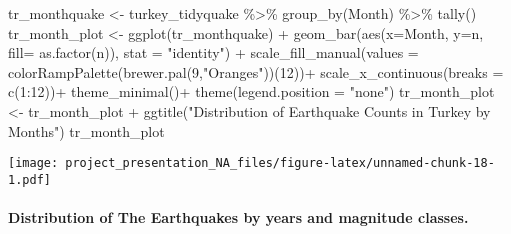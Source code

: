 \documentclass[
]{article}
\newenvironment{Shaded}{\begin{snugshade}}{\end{snugshade}}
\newcommand{\AttributeTok}[1]{\textcolor[rgb]{0.77,0.63,0.00}{#1}}
\newcommand{\DecValTok}[1]{\textcolor[rgb]{0.00,0.00,0.81}{#1}}
\newcommand{\FunctionTok}[1]{\textcolor[rgb]{0.00,0.00,0.00}{#1}}
\newcommand{\NormalTok}[1]{#1}
\newcommand{\OtherTok}[1]{\textcolor[rgb]{0.56,0.35,0.01}{#1}}
\newcommand{\SpecialCharTok}[1]{\textcolor[rgb]{0.00,0.00,0.00}{#1}}
\newcommand{\StringTok}[1]{\textcolor[rgb]{0.31,0.60,0.02}{#1}}
\begin{document}
\begin{Shaded}
\begin{Highlighting}[]
\NormalTok{tr\_monthquake }\OtherTok{\textless{}{-}}\NormalTok{ turkey\_tidyquake }\SpecialCharTok{\%\textgreater{}\%} 
                  \FunctionTok{group\_by}\NormalTok{(Month) }\SpecialCharTok{\%\textgreater{}\%} 
                  \FunctionTok{tally}\NormalTok{()}
\NormalTok{tr\_month\_plot }\OtherTok{\textless{}{-}} \FunctionTok{ggplot}\NormalTok{(tr\_monthquake) }\SpecialCharTok{+} \FunctionTok{geom\_bar}\NormalTok{(}\FunctionTok{aes}\NormalTok{(}\AttributeTok{x=}\NormalTok{Month, }\AttributeTok{y=}\NormalTok{n, }\AttributeTok{fill=} \FunctionTok{as.factor}\NormalTok{(n)),}
                                                  \AttributeTok{stat =} \StringTok{"identity"}\NormalTok{) }\SpecialCharTok{+}
                  \FunctionTok{scale\_fill\_manual}\NormalTok{(}\AttributeTok{values =} \FunctionTok{colorRampPalette}\NormalTok{(}\FunctionTok{brewer.pal}\NormalTok{(}\DecValTok{9}\NormalTok{,}\StringTok{"Oranges"}\NormalTok{))(}\DecValTok{12}\NormalTok{))}\SpecialCharTok{+}
                  \FunctionTok{scale\_x\_continuous}\NormalTok{(}\AttributeTok{breaks =} \FunctionTok{c}\NormalTok{(}\DecValTok{1}\SpecialCharTok{:}\DecValTok{12}\NormalTok{))}\SpecialCharTok{+}
                  \FunctionTok{theme\_minimal}\NormalTok{()}\SpecialCharTok{+}
                  \FunctionTok{theme}\NormalTok{(}\AttributeTok{legend.position =} \StringTok{"none"}\NormalTok{)}
\NormalTok{tr\_month\_plot }\OtherTok{\textless{}{-}}\NormalTok{ tr\_month\_plot }\SpecialCharTok{+} 
                  \FunctionTok{ggtitle}\NormalTok{(}\StringTok{"Distribution of Earthquake Counts in Turkey by Months"}\NormalTok{)}
\NormalTok{tr\_month\_plot}
\end{Highlighting}
\end{Shaded}

\texttt{[image: project\_presentation\_NA\_files/figure-latex/unnamed-chunk-18-1.pdf]}

\hypertarget{distribution-of-the-earthquakes-by-years-and-magnitude-classes.}{%
\paragraph{Distribution of The Earthquakes by years and magnitude
classes.}\label{distribution-of-the-earthquakes-by-years-and-magnitude-classes.}}
\end{document}
